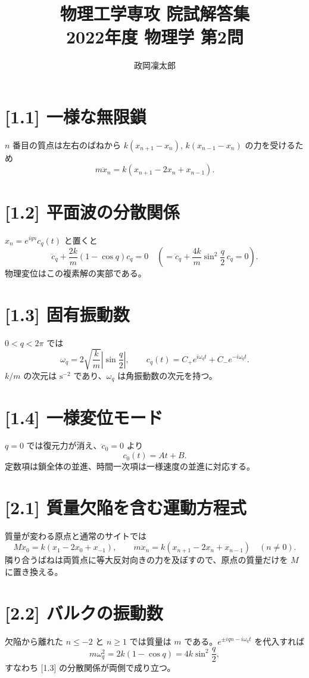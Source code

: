 \documentclass[11pt,a4paper]{article}
\title{物理工学専攻 院試解答集\\2022年度 物理学 第2問}
\author{政岡凜太郎}
\date{}
\begin{document}
\maketitle

\section*{[1.1] 一様な無限鎖}
$n$ 番目の質点は左右のばねから $k(x_{n+1}-x_n)$, $k(x_{n-1}-x_n)$ の力を受けるため
\[
\boxed{m\ddot x_n=k(x_{n+1}-2x_n+x_{n-1})}.
\]

\section*{[1.2] 平面波の分散関係}
$x_n=e^{iqn}c_q(t)$ と置くと
\[
\boxed{\ddot c_q+\frac{2k}{m}(1-\cos q)c_q=0}
\quad\left(=\ddot c_q+\frac{4k}{m}\sin^2\frac q2\,c_q=0\right).
\]
物理変位はこの複素解の実部である。

\section*{[1.3] 固有振動数}
$0<q<2\pi$ では
\[
\boxed{\omega_q=2\sqrt{\frac{k}{m}}\left|\sin\frac q2\right|},
\qquad c_q(t)=C_+e^{i\omega_qt}+C_-e^{-i\omega_qt}.
\]
$k/m$ の次元は $\mathrm{s}^{-2}$ であり、$\omega_q$ は角振動数の次元を持つ。

\section*{[1.4] 一様変位モード}
$q=0$ では復元力が消え、$\ddot c_0=0$ より
\[
\boxed{c_0(t)=At+B}.
\]
定数項は鎖全体の並進、時間一次項は一様速度の並進に対応する。

\section*{[2.1] 質量欠陥を含む運動方程式}
質量が変わる原点と通常のサイトでは
\[
M\ddot x_0=k(x_1-2x_0+x_{-1}),\qquad
m\ddot x_n=k(x_{n+1}-2x_n+x_{n-1})\quad(n\ne0).
\]
隣り合うばねは両質点に等大反対向きの力を及ぼすので、原点の質量だけを $M$ に置き換える。

\section*{[2.2] バルクの振動数}
欠陥から離れた $n\le-2$ と $n\ge1$ では質量は $m$ である。$e^{\pm iqn-i\omega_qt}$ を代入すれば
\[
\boxed{m\omega_q^2=2k(1-\cos q)=4k\sin^2\frac q2},
\]
すなわち [1.3] の分散関係が両側で成り立つ。
\end{document}
